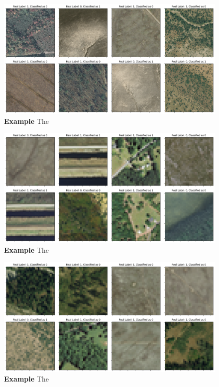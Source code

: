 \begin{figure}[h!]
	\centering
	\captionsetup{width=1\linewidth}
	\includegraphics[width=1\textwidth]{Figures/results/class_dataset03m_res03_wrong.png}
	\caption{\textbf{Example} The }
	\label{fig:dataset03m_res03_wrong}
\end{figure}

\begin{figure}[h!]
	\centering
	\captionsetup{width=1\linewidth}
	\includegraphics[width=1\textwidth]{Figures/results/class_dataset03m_res48_correct.png}
	\caption{\textbf{Example} The }
	\label{fig:dataset03m_res48_correct}
\end{figure}

\begin{figure}[h!]
	\centering
	\captionsetup{width=1\linewidth}
	\includegraphics[width=1\textwidth]{Figures/results/class_dataset03m_res48_wrong.png}
	\caption{\textbf{Example} The }
	\label{fig:dataset03m_res48_wrong}
\end{figure}

